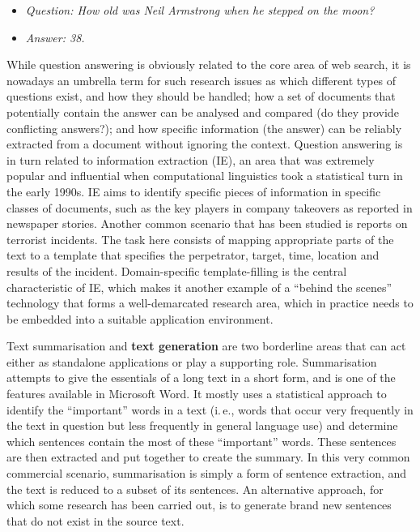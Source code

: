 \begin{multicols}{2}
  \begin{itemize}
  \item[] \textit{Question: How old was Neil Armstrong when he stepped on the moon?}
  \item[] \textit{Answer: 38.}
  \end{itemize}

  While question answering is obviously related to the core area of web search, it is nowadays an umbrella term for such research issues as which different types of questions exist, and how they should be handled; how a set of documents that potentially contain the answer can be analysed and compared (do they provide conflicting answers?); and how specific information (the answer) can be reliably extracted from a document without ignoring the context. Question answering is in turn related to information extraction (IE), an area that was extremely popular and influential when computational linguistics took a statistical turn in the early 1990s. IE aims to identify specific pieces of information in specific classes of documents, such as the key players in company takeovers as reported in newspaper stories. Another common scenario that has been studied is reports on terrorist incidents. The task here consists of mapping appropriate parts of the text to a template that specifies the perpetrator, target, time, location and results of the incident. Domain-specific template-filling is the central characteristic of IE, which makes it another example of a “behind the scenes” technology that forms a well-demarcated research area, which in practice needs to be embedded into a suitable application environment.


  Text summarisation and \textbf{text generation} are two borderline areas that can act either as standalone applications or play a supporting role. Summarisation attempts to give the essentials of a long text in a short form, and is one of the features available in Microsoft Word. It mostly uses a statistical approach to identify the “important” words in a text (i.\,e., words that occur very frequently in the text in question but less frequently in general language use) and determine which sentences contain the most of these “important” words. These sentences are then extracted and put together to create the summary. In this very common commercial scenario, summarisation is simply a form of sentence extraction, and the text is reduced to a subset of its sentences. An alternative approach, for which some research has been carried out, is to generate brand new sentences that do not exist in the source text.


\end{multicols}
